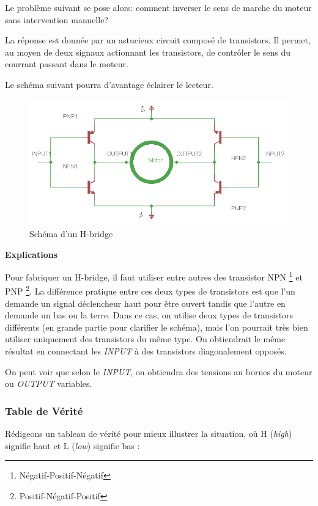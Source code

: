 \documentclass[a4paper,12pt]{report}
\begin{document}
{Le probl\`eme suivant se pose alors: comment inverser le sens de marche du
moteur sans intervention manuelle?

La r\'eponse est donn\'ee par un astucieux circuit compos\'e de
transistors. Il permet, au moyen de deux signaux actionnant les transistors,
de contr\^oler le sens du courrant passant dans le moteur.

Le sch\'ema suivant pourra d'avantage \'eclairer le lecteur.

\begin{figure}[h]
\centering
\includegraphics[width=1.0\textwidth]{figures/H-bridge}
    \caption{\label{H-bridge}Sch\'ema d'un H-bridge}
\end{figure}

\textbf{Explications}

Pour fabriquer un H-bridge, il faut utiliser entre autres des transistor NPN \footnote{Négatif-Positif-Négatif} et PNP \footnote{Positif-Négatif-Positif}.  La diff\'erence pratique
entre ces deux types de transistors est que l'un demande un signal
d\'eclencheur haut pour \^etre ouvert tandis que l'autre en demande un
bas ou la terre. Dans ce cas, on utilise deux types de transistors
diff\'erents (en grande partie pour clarifier le sch\'ema), mais l'on pourrait
tr\`es bien utiliser uniquement des transistors du m\^eme type. On obtiendrait
le m\^eme r\'esultat en connectant les \emph{INPUT} \`a des transistors
diagonalement oppos\'es\cite{RobotRoom}.

On peut voir que selon le \emph{INPUT}, on obtiendra des tensions au bornes du
moteur ou \emph{OUTPUT} variables.
\subsubsection{Table de V\'erit\'e}
R\'edigeons un tableau de v\'erit\'e pour mieux illustrer la situation, o\`u H
(\textit{high}) signifie haut et L (\textit{low}) signifie bas :


}
\end{document}
